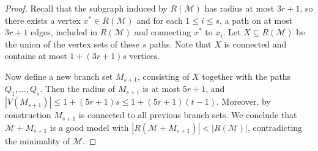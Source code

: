 \documentclass[10pt,a4paper]{amsart}
\renewcommand{\leq}{\leqslant}
\renewcommand{\le}{\leqslant}
\begin{document}
\begin{proof}
Recall that the subgraph induced by $R(\mathcal{M})$ has radius at most $3r+1$, so there exists a vertex $x^*\in R(\mathcal{M})$ and for each $1\le i \le s$, a path on at most $3r+1$ edges, included in $R(\mathcal{M})$ and connecting $x^*$ to  $x_i$. Let $X\subseteq R(\mathcal{M})$ be the union of the vertex sets of these $s$ paths. Note that $X$ is connected and contains at most $1+(3r+1)s$ vertices. 

Now define a new branch set $M_{s+1}$, consisting of $X$ together with the paths $Q_1,\ldots, Q_s$. Then the radius of $M_{s+1}$ is at most $5r+1$, and $|V(M_{s+1})|\leq 1+(5r+1)s\le 1+(5r+1)(t-1)$. 
Moreover, by construction $M_{s+1}$ is connected to all previous branch sets. We conclude that $\mathcal{M}+M_{s+1}$ is a good model with $|R(\mathcal{M}+M_{s+1})|<|R(\mathcal{M})|$, contradicting the minimality of $\mathcal{M}$.
\end{proof}
\end{document}
